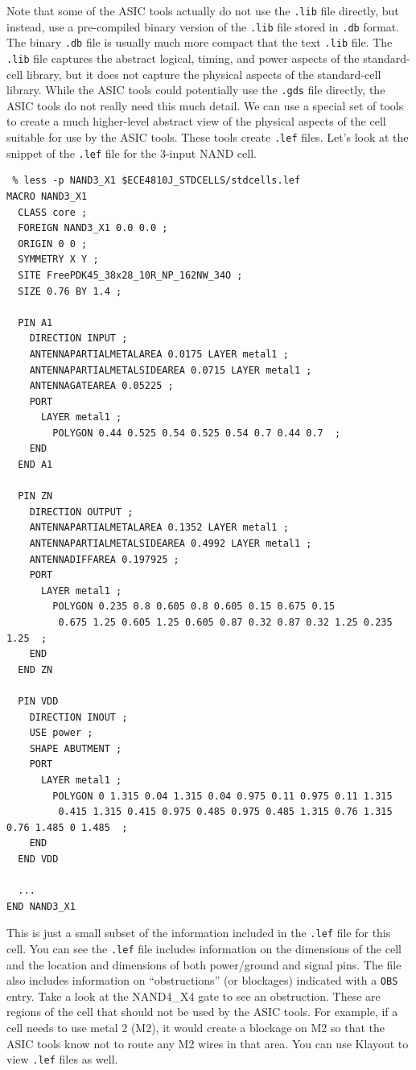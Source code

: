 \documentclass[a4paper,12pt,twoside]{article}
\begin{document}
Note that some of the ASIC tools actually do not use the \texttt{.lib} file directly, but instead, use a pre-compiled binary version of the \texttt{.lib} file stored in \texttt{.db} format. The binary \texttt{.db} file is usually much more compact that the text \texttt{.lib} file. The \texttt{.lib} file captures the abstract logical, timing, and power aspects of the standard-cell library, but it does not capture the physical aspects of the standard-cell library. While the ASIC tools could potentially use the \texttt{.gds} file directly, the ASIC tools do not really need this much detail. We can use a special set of tools to create a much higher-level abstract view of the physical aspects of the cell suitable for use by the ASIC tools. These tools create \texttt{.lef} files. Let’s look at the snippet of the \texttt{.lef} file for the 3-input NAND cell.
\begin{verbatim}
 % less -p NAND3_X1 $ECE4810J_STDCELLS/stdcells.lef
MACRO NAND3_X1
  CLASS core ;
  FOREIGN NAND3_X1 0.0 0.0 ;
  ORIGIN 0 0 ;
  SYMMETRY X Y ;
  SITE FreePDK45_38x28_10R_NP_162NW_34O ;
  SIZE 0.76 BY 1.4 ;

  PIN A1
    DIRECTION INPUT ;
    ANTENNAPARTIALMETALAREA 0.0175 LAYER metal1 ;
    ANTENNAPARTIALMETALSIDEAREA 0.0715 LAYER metal1 ;
    ANTENNAGATEAREA 0.05225 ;
    PORT
      LAYER metal1 ;
        POLYGON 0.44 0.525 0.54 0.525 0.54 0.7 0.44 0.7  ;
    END
  END A1

  PIN ZN
    DIRECTION OUTPUT ;
    ANTENNAPARTIALMETALAREA 0.1352 LAYER metal1 ;
    ANTENNAPARTIALMETALSIDEAREA 0.4992 LAYER metal1 ;
    ANTENNADIFFAREA 0.197925 ;
    PORT
      LAYER metal1 ;
        POLYGON 0.235 0.8 0.605 0.8 0.605 0.15 0.675 0.15
         0.675 1.25 0.605 1.25 0.605 0.87 0.32 0.87 0.32 1.25 0.235 1.25  ;
    END
  END ZN

  PIN VDD
    DIRECTION INOUT ;
    USE power ;
    SHAPE ABUTMENT ;
    PORT
      LAYER metal1 ;
        POLYGON 0 1.315 0.04 1.315 0.04 0.975 0.11 0.975 0.11 1.315
         0.415 1.315 0.415 0.975 0.485 0.975 0.485 1.315 0.76 1.315 0.76 1.485 0 1.485  ;
    END
  END VDD

  ...
END NAND3_X1
\end{verbatim}
This is just a small subset of the information included in the \texttt{.lef} file for this cell. You can see the \texttt{.lef} file includes information on the dimensions of the cell and the location and dimensions of both power/ground and signal pins. The file also includes information on “obstructions” (or blockages) indicated with a \texttt{OBS} entry. Take a look at the NAND4\_X4 gate to see an obstruction. These are regions of the cell that should not be used by the ASIC tools. For example, if a cell needs to use metal 2 (M2), it would create a blockage on M2 so that the ASIC tools know not to route any M2 wires in that area. You can use Klayout to view \texttt{.lef} files as well.
\end{document}
